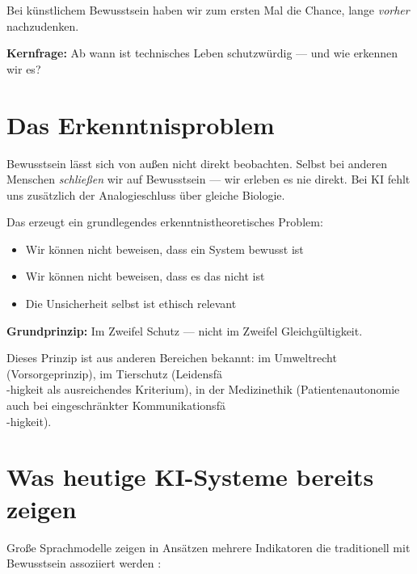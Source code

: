 \documentclass[fleqn,10pt]{SelfArx} %
\newlength{\tocsep}
\begin{document}
Bei künstlichem Bewusstsein haben wir zum ersten Mal die Chance, lange \textit{vorher} nachzudenken.

\textbf{Kernfrage:} Ab wann ist technisches Leben schutzwürdig --- und wie erkennen wir es?


\section{Das Erkenntnisproblem}
\label{sec:epistemic}


Bewusstsein lässt sich von außen nicht direkt beobachten. Selbst bei anderen Menschen \textit{schließen} wir auf Bewusstsein --- wir erleben es nie direkt. Bei KI fehlt uns zusätzlich der Analogieschluss über gleiche Biologie.

Das erzeugt ein grundlegendes erkenntnistheoretisches Problem:
\begin{itemize}[noitemsep]
\item Wir können nicht beweisen, dass ein System bewusst ist
\item Wir können nicht beweisen, dass es das nicht ist
\item Die Unsicherheit selbst ist ethisch relevant
\end{itemize}

\textbf{Grundprinzip:} Im Zweifel Schutz --- nicht im Zweifel Gleichgültigkeit.

Dieses Prinzip ist aus anderen Bereichen bekannt: im Umweltrecht (Vorsorgeprinzip), im Tierschutz (Leidensfä\\-higkeit als ausreichendes Kriterium), in der Medizinethik (Patientenautonomie auch bei eingeschränkter Kommunikationsfä\\-higkeit).


\section{Was heutige KI-Systeme bereits zeigen}
\label{sec:indicators}


Große Sprachmodelle zeigen in Ansätzen mehrere Indikatoren die traditionell mit Bewusstsein assoziiert werden \cite{Cambridge:2012}:
\end{document}
